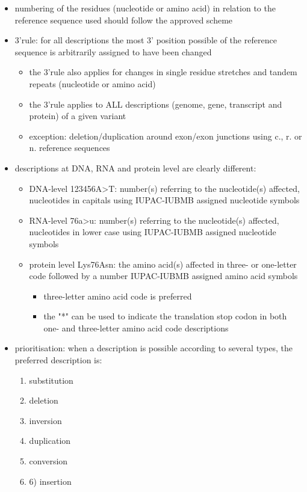 \documentclass[12pt]{scrartcl}
\begin{document}
\begin{itemize}
\begin{itemize}
\begin{itemize}
\end{itemize}
\item numbering of the residues (nucleotide or amino acid) in relation to the reference sequence used should follow the approved scheme
\item 3'rule: for all descriptions the most 3' position possible of the reference sequence is arbitrarily assigned to have been changed
\begin{itemize}
\item the 3'rule also applies for changes in single residue stretches and tandem repeats (nucleotide or amino acid)
\item the 3'rule applies to ALL descriptions (genome, gene, transcript and protein) of a given variant
\item exception: deletion/duplication around exon/exon junctions using c., r. or n. reference sequences
\end{itemize}
\item descriptions at DNA, RNA and protein level are clearly different:
\begin{itemize}
\item DNA-level 123456A>T: number(s) referring to the nucleotide(s)
affected, nucleotides in capitals using IUPAC-IUBMB assigned
nucleotide symbols
\item RNA-level 76a>u: number(s) referring to the nucleotide(s) affected, nucleotides in lower case using IUPAC-IUBMB assigned nucleotide symbols
\item protein level Lys76Asn: the amino acid(s) affected in three- or one-letter code followed by a number IUPAC-IUBMB assigned amino acid symbols
\begin{itemize}
\item three-letter amino acid code is preferred
\item the "*" can be used to indicate the translation stop codon in both one- and three-letter amino acid code descriptions
\end{itemize}
\end{itemize}
\item prioritisation: when a description is possible according to several types, the preferred description is:
\begin{enumerate}
\item substitution
\item deletion
\item inversion
\item duplication
\item conversion
\item 6) insertion

\end{enumerate}
\end{itemize}
\end{itemize}
\end{document}
